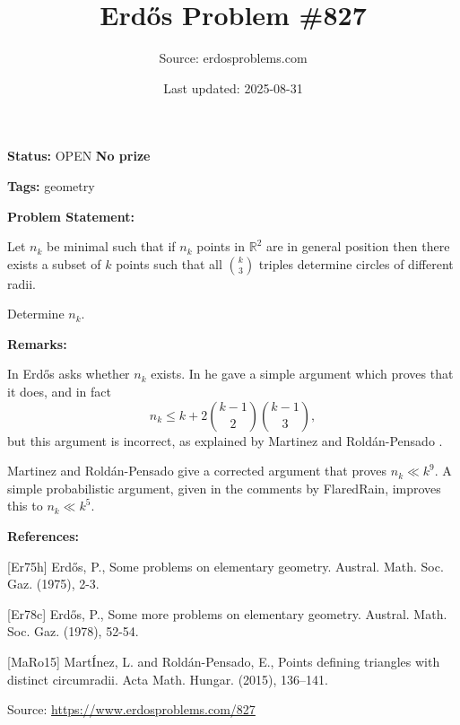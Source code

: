 \documentclass{article}
\title{Erd\H{o}s Problem \#827}
\date{Last updated: 2025-08-31}
\author{Source: erdosproblems.com}
\begin{document}
\maketitle

\noindent\textbf{Status:} OPEN \quad \textbf{No prize}

\noindent\textbf{Tags:} geometry

\medskip
\noindent\textbf{Problem Statement:}

Let $n_k$ be minimal such that if $n_k$ points in $\mathbb{R}^2$ are in general position then there exists a subset of $k$ points such that all $\binom{k}{3}$ triples determine circles of different radii.

Determine $n_k$.

\bigskip
\noindent\textbf{Remarks:}

In \cite{Er75h} Erd\H{o}s asks whether $n_k$ exists. In \cite{Er78c} he gave a simple argument which proves that it does, and in fact\[n_k \leq k+2\binom{k-1}{2}\binom{k-1}{3},\]but this argument is incorrect, as explained by Martinez and Rold\'{a}n-Pensado \cite{MaRo15}.

Martinez and Rold\'{a}n-Pensado give a corrected argument that proves $n_k\ll k^9$. A simple probabilistic argument, given in the comments by FlaredRain, improves this to $n_k\ll k^5$.

\bigskip
\noindent\textbf{References:}

[Er75h] Erd\H{o}s, P., Some problems on elementary geometry. Austral. Math. Soc. Gaz. (1975), 2-3.
 
 [Er78c] Erd\H{o}s, P., Some more problems on elementary geometry. Austral. Math. Soc. Gaz. (1978), 52-54.
 
 [MaRo15] Mart\'Inez, L. and Rold\'{a}n-Pensado, E., Points defining triangles with distinct circumradii. Acta Math. Hungar. (2015), 136--141.

\bigskip
\noindent\small{Source: \url{https://www.erdosproblems.com/827}}
\end{document}
